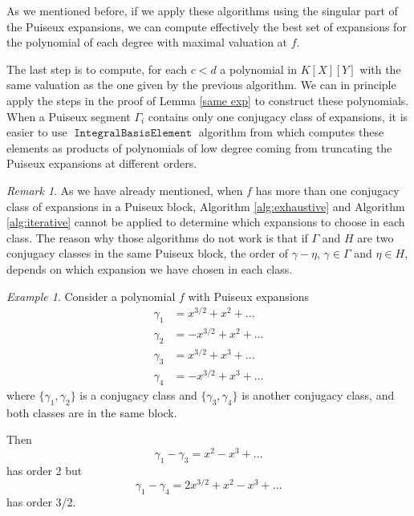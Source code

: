 \documentclass[a4paper,11pt]{amsart}%
\theoremstyle{definition}
\theoremstyle{plain}
\theoremstyle{remark}
\newtheorem{remark}[defn]{Remark}
\newtheorem{example}[defn]{Example}
\DeclareMathOperator{\TruncatedFactor}{\mathtt{IntegralBasisElement}}
\begin{document}

As we mentioned before, if we apply these algorithms using the singular part of the Puiseux expansions, we can compute effectively the best set of expansions for the polynomial of each degree with maximal valuation at $f$.

The last step is to compute, for each $c < d$ a polynomial in $K[X][Y]$ with the same valuation as the one given by the previous algorithm.
We can in principle apply the steps in the proof of Lemma \ref{same exp} to construct these polynomials. When a Puiseux segment $\Gamma_i$ contains only one conjugacy class of expansions, it is easier to use $\TruncatedFactor$ algorithm from \cite{intbas} which computes these elements as products of polynomials of low degree coming from truncating the Puiseux expansions at different orders.


\begin{remark}
As we have already mentioned, when $f$ has more than one conjugacy class of expansions in a Puiseux block, Algorithm \ref{alg:exhaustive} and Algorithm \ref{alg:iterative} cannot be applied to determine which expansions to choose in each class.
The reason why those algorithms do not work is that if $\Gamma$ and $H$ are two conjugacy classes in the same Puiseux block, the order of $\gamma - \eta$, $\gamma \in \Gamma$ and $\eta \in H$, depends on which expansion we have chosen in each class.
\end{remark}

\begin{example}
Consider a polynomial $f$ with Puiseux expansions
\begin{align*}
\gamma_1 &= x^{3/2} + x^2 + \dots \\
\gamma_2 &= - x^{3/2} + x^2 + \dots \\
\gamma_3 &= x^{3/2} + x^3 + \dots \\
\gamma_4 &= -x^{3/2} + x^3 + \dots
\end{align*}
where $\{\gamma_1, \gamma_2\}$ is a conjugacy class and $\{\gamma_3, \gamma_4\}$ is another conjugacy class, and both classes are in the same block.

Then
$$\gamma_1 - \gamma_3 = x^2 - x^3 + \dots$$
has order 2 but
$$\gamma_1 - \gamma_4 = 2 x^{3/2} + x^2 - x^3 + \dots$$
has order 3/2.
\end{example}
\end{document}
